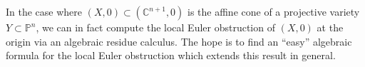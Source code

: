 \documentclass[a4paper]{article}
\begin{document}
In the case where $(X,0) \subset (\mathbb{C}^{n+1}, 0)$ is the affine cone 
of a projective variety $Y \subset \mathbb{P}^n$, we can in fact 
compute the local Euler obstruction of $(X,0)$ at the origin 
via an algebraic residue calculus. 
The hope is to find 
an ``easy'' algebraic formula for the local Euler obstruction 
which extends this result in general. 



\printbibliography
\end{document}
